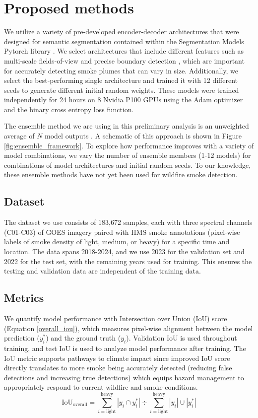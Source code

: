 \documentclass{article}
\begin{document}
\section{Proposed methods}
We utilize a variety of pre-developed encoder-decoder architectures that were designed for semantic segmentation contained within the Segmentation Models Pytorch library \citep{semantic}. We select architectures that include different features such as multi-scale fields-of-view and precise boundary detection \citep{dlv3p,PAN,UNetpp}, which are important for accurately detecting smoke plumes that can vary in size. Additionally, we select the best-performing single architecture and trained it with 12 different seeds to generate different initial random weights. These models were trained independently for 24 hours on 8 Nvidia P100 GPUs using the Adam optimizer and the binary cross entropy loss function. 

The ensemble method we are using in this preliminary analysis is an unweighted average of $N$ model outputs \citep{nn-ensemble2}. A schematic of this approach is shown in Figure \ref{fig:ensemble_framework}. To explore how performance improves with a variety of model combinations, we vary the number of ensemble members (1-12 models) for combinations of model architectures and initial random seeds. To our knowledge, these ensemble methods have not yet been used for wildfire smoke detection.

\subsection{Dataset}
The dataset we use consists of 183,672 samples, each with three spectral channels (C01-C03) of GOES imagery paired with HMS smoke annotations (pixel-wise labels of smoke density of light, medium, or heavy) for a specific time and location. The data spans 2018-2024, and we use 2023 for the validation set and 2022 for the test set, with the remaining years used for training. This ensures the testing and validation data are independent of the training data.

\subsection{Metrics} We quantify model performance with Intersection over Union (IoU) score (Equation \ref{overall_iou}), which measures pixel-wise alignment between the model prediction ($y^*_{i}$) and the ground truth ($y_{i}$). Validation IoU is used throughout training, and test IoU is used to analyze model performance after training. The IoU metric supports pathways to climate impact since improved IoU score directly translates to more smoke being accurately detected (reducing false detections and increasing true detections) which equips hazard management to appropriately respond to current wildfire and smoke conditions.
\begin{equation} \label{overall_iou}
    \text{IoU}_{\text{overall}} = {\sum\limits_{i=\text{light}}^{\text{heavy}}|y_{i}\cap y^*_{i}|} \div {\sum\limits_{i=\text{light}}^{\text{heavy}}|y_{i}|\cup|y^*_{i}|}
\end{equation}
\end{document}
